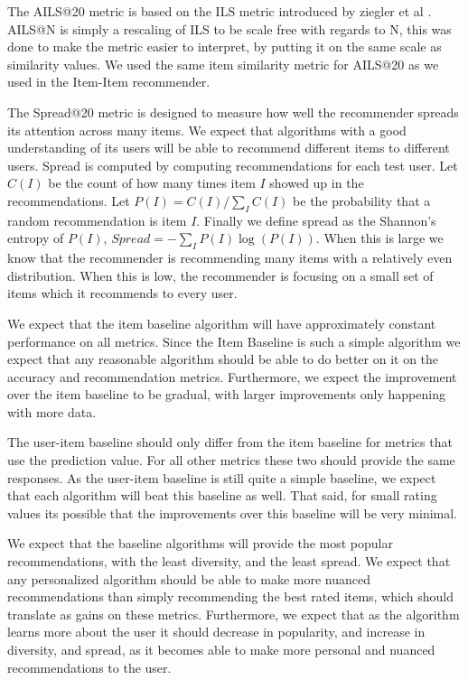 \documentclass[letterpaper]{sig-alternate}
\begin{document}
  The AILS@20 metric is based on the ILS metric introduced by ziegler et al \cite{zieglerDiversity}.
  AILS@N is simply a rescaling of ILS to be scale free with regards to N, this was done to make the metric easier to interpret, by putting it on the same scale as similarity values.
  We used the same item similarity metric for AILS@20 as we used in the Item-Item recommender.

  The Spread@20 metric is designed to measure how well the recommender spreads its attention across many items.
  We expect that algorithms with a good understanding of its users will be able to recommend different items to different users.
  Spread is computed by computing recommendations for each test user.
  Let $C(I)$ be the count of how many times item $I$ showed up in the recommendations.
  Let $P(I) = C(I) / \sum_I C(I)$ be the probability that a random recommendation is item $I$.
  Finally we define spread as the Shannon's entropy of $P(I)$, $Spread = -\sum_I P(I) \log(P(I))$.
  When this is large we know that the recommender is recommending many items with a relatively even distribution.
  When this is low, the recommender is focusing on a small set of items which it recommends to every user.

  We expect that the item baseline algorithm will have approximately constant performance on all metrics.
  Since the Item Baseline is such a simple algorithm we expect that any reasonable algorithm should be able to do better on it on the accuracy and recommendation metrics.
  Furthermore, we expect the improvement over the item baseline to be gradual, with larger improvements only happening with more data.

  The user-item baseline should only differ from the item baseline for metrics that use the prediction value.
  For all other metrics these two should provide the same responses.
  As the user-item baseline is still quite a simple baseline, we expect that each algorithm will beat this baseline as well.
  That said, for small rating values its possible that the improvements over this baseline will be very minimal.
  
  We expect that the baseline algorithms will provide the most popular recommendations, with the least diversity, and the least spread.
  We expect that any personalized algorithm should be able to make more nuanced recommendations than simply recommending the best rated items, which should translate as gains on these metrics.
  Furthermore, we expect that as the algorithm learns more about the user it should decrease in popularity, and increase in diversity, and spread, as it becomes able to make more personal and nuanced recommendations to the user.
  
\end{document}
